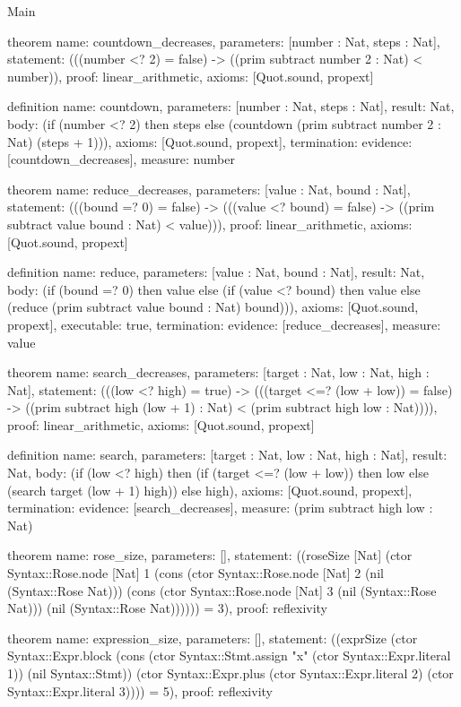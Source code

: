 \begin{lexlean}{Main}
\begin{semanticmodule}
theorem{
  name: countdown_decreases,
  parameters: [number : Nat, steps : Nat],
  statement: (((number <? 2) = false) -> ((prim subtract number 2 : Nat) < number)),
  proof: linear_arithmetic{},
  axioms: [Quot.sound, propext]
}

definition{
  name: countdown,
  parameters: [number : Nat, steps : Nat],
  result: Nat,
  body: (if (number <? 2) then steps else (countdown (prim subtract number 2 : Nat) (steps + 1))),
  axioms: [Quot.sound, propext],
  termination: {evidence: [countdown_decreases], measure: number}
}

theorem{
  name: reduce_decreases,
  parameters: [value : Nat, bound : Nat],
  statement: (((bound =? 0) = false) -> (((value <? bound) = false) -> ((prim subtract value bound : Nat) < value))),
  proof: linear_arithmetic{},
  axioms: [Quot.sound, propext]
}

definition{
  name: reduce,
  parameters: [value : Nat, bound : Nat],
  result: Nat,
  body: (if (bound =? 0) then value else (if (value <? bound) then value else (reduce (prim subtract value bound : Nat) bound))),
  axioms: [Quot.sound, propext],
  executable: true,
  termination: {evidence: [reduce_decreases], measure: value}
}

theorem{
  name: search_decreases,
  parameters: [target : Nat, low : Nat, high : Nat],
  statement: (((low <? high) = true) -> (((target <=? (low + low)) = false) -> ((prim subtract high (low + 1) : Nat) < (prim subtract high low : Nat)))),
  proof: linear_arithmetic{},
  axioms: [Quot.sound, propext]
}

definition{
  name: search,
  parameters: [target : Nat, low : Nat, high : Nat],
  result: Nat,
  body: (if (low <? high) then (if (target <=? (low + low)) then low else (search target (low + 1) high)) else high),
  axioms: [Quot.sound, propext],
  termination: {evidence: [search_decreases], measure: (prim subtract high low : Nat)}
}

theorem{
  name: rose_size,
  parameters: [],
  statement: ((roseSize [Nat] (ctor Syntax::Rose.node [Nat] 1 (cons (ctor Syntax::Rose.node [Nat] 2 (nil (Syntax::Rose Nat))) (cons (ctor Syntax::Rose.node [Nat] 3 (nil (Syntax::Rose Nat))) (nil (Syntax::Rose Nat)))))) = 3),
  proof: reflexivity{}
}

theorem{
  name: expression_size,
  parameters: [],
  statement: ((exprSize (ctor Syntax::Expr.block (cons (ctor Syntax::Stmt.assign "x" (ctor Syntax::Expr.literal 1)) (nil Syntax::Stmt)) (ctor Syntax::Expr.plus (ctor Syntax::Expr.literal 2) (ctor Syntax::Expr.literal 3)))) = 5),
  proof: reflexivity{}
}


\end{semanticmodule}
\end{lexlean}

